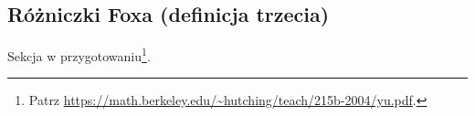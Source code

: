 \subsection{Różniczki Foxa (definicja trzecia)}
Sekcja w przygotowaniu\footnote{Patrz \url{https://math.berkeley.edu/~hutching/teach/215b-2004/yu.pdf}.}.

